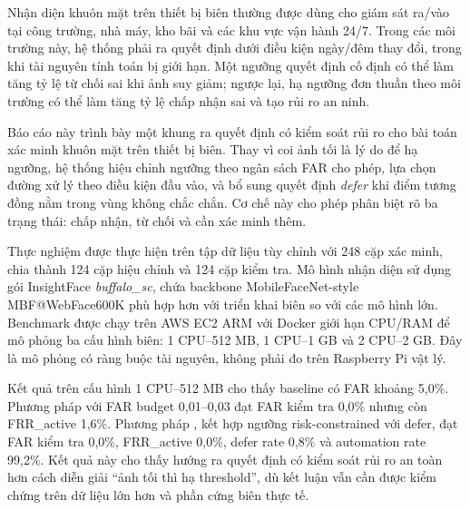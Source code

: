 Nhận diện khuôn mặt trên thiết bị biên thường được dùng cho giám sát ra/vào tại công trường, nhà máy, kho bãi và các khu vực vận hành 24/7. Trong các môi trường này, hệ thống phải ra quyết định dưới điều kiện ngày/đêm thay đổi, trong khi tài nguyên tính toán bị giới hạn. Một ngưỡng quyết định cố định có thể làm tăng tỷ lệ từ chối sai khi ảnh suy giảm; ngược lại, hạ ngưỡng đơn thuần theo môi trường có thể làm tăng tỷ lệ chấp nhận sai và tạo rủi ro an ninh.

Báo cáo này trình bày một khung ra quyết định có kiểm soát rủi ro cho bài toán xác minh khuôn mặt trên thiết bị biên. Thay vì coi ảnh tối là lý do để hạ ngưỡng, hệ thống hiệu chỉnh ngưỡng theo ngân sách FAR cho phép, lựa chọn đường xử lý theo điều kiện đầu vào, và bổ sung quyết định \textit{defer} khi điểm tương đồng nằm trong vùng không chắc chắn. Cơ chế này cho phép phân biệt rõ ba trạng thái: chấp nhận, từ chối và cần xác minh thêm.

Thực nghiệm được thực hiện trên tập dữ liệu tùy chỉnh với 248 cặp xác minh, chia thành 124 cặp hiệu chỉnh và 124 cặp kiểm tra. Mô hình nhận diện sử dụng gói InsightFace \textit{buffalo\_sc}, chứa backbone MobileFaceNet-style MBF@WebFace600K phù hợp hơn với triển khai biên so với các mô hình lớn. Benchmark được chạy trên AWS EC2 ARM với Docker giới hạn CPU/RAM để mô phỏng ba cấu hình biên: 1 CPU--512 MB, 1 CPU--1 GB và 2 CPU--2 GB. Đây là mô phỏng có ràng buộc tài nguyên, không phải đo trên Raspberry Pi vật lý.

Kết quả trên cấu hình 1 CPU--512 MB cho thấy baseline  có FAR khoảng 5,0\%. Phương pháp  với FAR budget 0,01--0,03 đạt FAR kiểm tra 0,0\% nhưng còn FRR\_active 1,6\%. Phương pháp , kết hợp ngưỡng risk-constrained với defer, đạt FAR kiểm tra 0,0\%, FRR\_active 0,0\%, defer rate 0,8\% và automation rate 99,2\%. Kết quả này cho thấy hướng ra quyết định có kiểm soát rủi ro an toàn hơn cách diễn giải ``ảnh tối thì hạ threshold'', dù kết luận vẫn cần được kiểm chứng trên dữ liệu lớn hơn và phần cứng biên thực tế.
